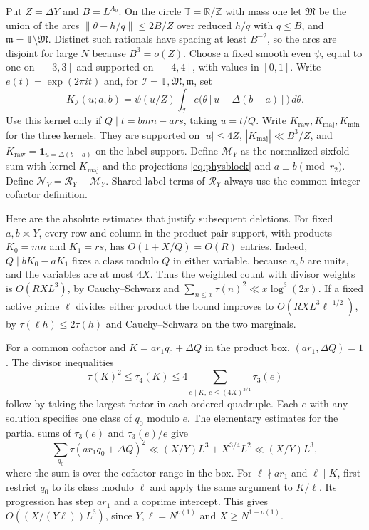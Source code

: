 \documentclass[11pt]{amsart}
\numberwithin{equation}{section}
\theoremstyle{remark}
\begin{document}
Put $Z=\Delta Y$ and $B=L^{A_0}$. On the circle $\mathbb T=\mathbb R/\mathbb Z$
with mass one let $\mathfrak M$ be the union of the arcs
$\|\theta-h/q\|\le2B/Z$ over reduced $h/q$ with $q\le B$, and
$\mathfrak m=\mathbb T\setminus\mathfrak M$. Distinct such rationals
have spacing at least $B^{-2}$, so the arcs are disjoint for large $N$
because $B^3=o(Z)$. Choose a fixed smooth even
$\psi$, equal to one on $[-3,3]$ and supported on $[-4,4]$, with values in
$[0,1]$. Write $e(t)=\exp(2\pi i t)$ and, for $\mathcal I=\mathbb T,\mathfrak M,\mathfrak m$, set
\begin{equation}\label{eq:arckernel}
 K_{\mathcal I}(u;a,b)=\psi(u/Z)
    \int_{\mathcal I} e\bigl(\theta[u-\Delta(b-a)]\bigr)\,d\theta.
\end{equation}
Use this kernel only if $Q\mid t=bmn-ars$, taking $u=t/Q$.
Write $K_{\mathrm{raw}},K_{\mathrm{maj}},K_{\mathrm{min}}$ for the three
kernels. They are supported on $|u|\le4Z$, $|K_{\mathrm{maj}}|\ll B^3/Z$,
and $K_{\mathrm{raw}}=\mathbf1_{u=\Delta(b-a)}$ on the label support.
Define $\mathcal M_Y$ as the normalized sixfold sum with kernel
$K_{\mathrm{maj}}$ and the projections \eqref{eq:physblock} and
$a\equiv b\pmod{r_2}$. Define $\mathcal N_Y=\mathcal R_Y-\mathcal M_Y$.
Shared-label terms of $\mathcal R_Y$ always use the common integer
cofactor definition.

Here are the absolute estimates that justify subsequent deletions.
For fixed $a,b\asymp Y$, every row and column in the product-pair
support, with products $K_0=mn$ and $K_1=rs$, has $O(1+X/Q)=O(R)$
entries. Indeed, $Q\mid bK_0-aK_1$ fixes a class modulo $Q$ in either
variable, because $a,b$ are units, and the variables are at most $4X$.
Thus the weighted count with divisor weights is $O(RXL^3)$, by
Cauchy--Schwarz and $\sum_{n\le x}\tau(n)^2\ll x\log^3(2x)$. If a
fixed active prime $\ell$ divides either product the bound improves
to $O(RXL^3\ell^{-1/2})$, by $\tau(\ell h)\le2\tau(h)$ and
Cauchy--Schwarz on the two marginals.

For a common cofactor and $K=ar_1q_0+\Delta Q$ in the product box,
$(ar_1,\Delta Q)=1$. The divisor inequalities
\[
 \tau(K)^2\le\tau_4(K)\le
 4\sum_{e\mid K,\ e\le (4X)^{3/4}}\tau_3(e)
\]
follow by taking the largest factor in each ordered quadruple.
Each $e$ with any solution specifies one class of $q_0$ modulo $e$.
The elementary estimates for the partial sums of $\tau_3(e)$ and
$\tau_3(e)/e$ give
\begin{equation}\label{eq:cofactorsecondmoment}
 \sum_{q_0}\tau(ar_1q_0+\Delta Q)^2
 \ll (X/Y)L^3+X^{3/4}L^2\ll (X/Y)L^3,
\end{equation}
where the sum is over the cofactor range in the box. For $\ell\nmid ar_1$
and $\ell\mid K$, first restrict $q_0$ to its class modulo $\ell$ and
apply the same argument to $K/\ell$. Its progression has step $ar_1$
and a coprime intercept. This gives $O((X/(Y\ell))L^3)$, since
$Y,\ell=N^{o(1)}$ and $X\ge N^{1-o(1)}$.
\end{document}
